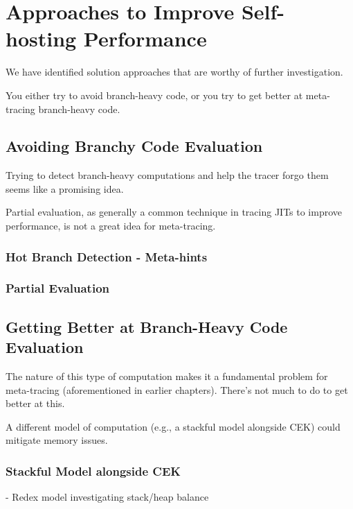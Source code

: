 \chapter{Approaches to Improve Self-hosting Performance}
	\begin{chapterpoint}
		We have identified solution approaches that are worthy of further investigation.

		You either try to avoid branch-heavy code, or you try to get better at meta-tracing branch-heavy code.
	\end{chapterpoint}

	\section{Avoiding Branchy Code Evaluation}
		\begin{mainpoint}
			Trying to detect branch-heavy computations and help the tracer forgo them seems like a promising idea.

			Partial evaluation, as generally a common technique in tracing JITs to improve performance, is not a great idea for meta-tracing.
		\end{mainpoint}
		\subsection{Hot Branch Detection - Meta-hints}
		\subsection{Partial Evaluation}

	\section{Getting Better at Branch-Heavy Code Evaluation}
		\begin{mainpoint}
			The nature of this type of computation makes it a fundamental problem for meta-tracing (aforementioned in earlier chapters). There's not much to do to get better at this.

			A different model of computation (e.g., a stackful model alongside CEK) could mitigate memory issues.
		\end{mainpoint}

		\subsection{Stackful Model alongside CEK}
		- Redex model investigating stack/heap balance
